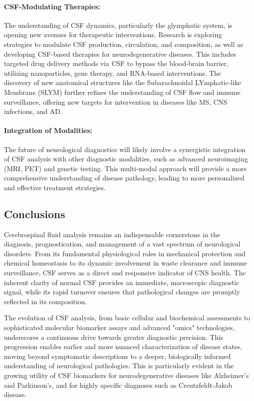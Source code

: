 	\paragraph{CSF-Modulating Therapies:} The understanding of CSF dynamics, particularly the glymphatic system, is opening new avenues for therapeutic interventions. Research is exploring strategies to modulate CSF production, circulation, and composition, as well as developing CSF-based therapies for neurodegenerative diseases. This includes targeted drug delivery methods via CSF to bypass the blood-brain barrier, utilizing nanoparticles, gene therapy, and RNA-based interventions. The discovery of new anatomical structures like the Subarachnoidal LYmphatic-like Membrane (SLYM) further refines the understanding of CSF flow and immune surveillance, offering new targets for intervention in diseases like MS, CNS infections, and AD.
	
	\paragraph{Integration of Modalities:} The future of neurological diagnostics will likely involve a synergistic integration of CSF analysis with other diagnostic modalities, such as advanced neuroimaging (MRI, PET) and genetic testing. This multi-modal approach will provide a more comprehensive understanding of disease pathology, leading to more personalized and effective treatment strategies.
	
	\subsection*{Conclusions}
	
	Cerebrospinal fluid analysis remains an indispensable cornerstone in the diagnosis, prognostication, and management of a vast spectrum of neurological disorders. From its fundamental physiological roles in mechanical protection and chemical homeostasis to its dynamic involvement in waste clearance and immune surveillance, CSF serves as a direct and responsive indicator of CNS health. The inherent clarity of normal CSF provides an immediate, macroscopic diagnostic signal, while its rapid turnover ensures that pathological changes are promptly reflected in its composition.
	
	The evolution of CSF analysis, from basic cellular and biochemical assessments to sophisticated molecular biomarker assays and advanced "omics" technologies, underscores a continuous drive towards greater diagnostic precision. This progression enables earlier and more nuanced characterization of disease states, moving beyond symptomatic descriptions to a deeper, biologically informed understanding of neurological pathologies. This is particularly evident in the growing utility of CSF biomarkers for neurodegenerative diseases like Alzheimer's and Parkinson's, and for highly specific diagnoses such as Creutzfeldt-Jakob disease.
	

